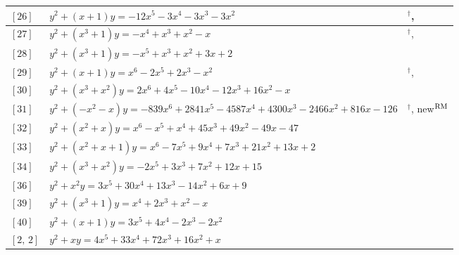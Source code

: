 \documentclass[11pt]{amsart}
\begin{document}
\begin{longtable}{|>{\raggedright\arraybackslash}p{1.7cm}|>{\raggedright\arraybackslash}p{}|>{\raggedright\arraybackslash}p{2.1cm}|}
$[26]$ & \href{https://alpha.lmfdb.org/Genus2Curve/Q/?jump=[[0,0,-3,-3,-3,-12],[1,1]]}{$y^2 + (x+1)y = -12x^{5}-3x^{4}-3x^{3}-3x^{2}$} & \cite{Leprevost1993}$^\dagger$, \cite{Leprevost1995}\\ \hline
$[27]$ & \href{https://www.lmfdb.org/Genus2Curve/Q/604/a/9664/2}{$y^2 + (x^{3}+1)y = -x^{4}+x^{3}+x^{2}-x$} & \cite{Howe2015}$^\dagger$, \cite{Nicholls2018}\\ \hline
$[28]$ & \href{https://www.lmfdb.org/Genus2Curve/Q/249/a/6723/1}{$y^2 + (x^{3}+1)y = -x^{5}+x^{3}+x^{2}+3x+2$} & \cite{PP2012,PZP2013}\\ \hline
$[29]$ & \href{https://www.lmfdb.org/Genus2Curve/Q/976/a/999424/1}{$y^2 + (x+1)y = x^{6}-2x^{5}+2x^{3}-x^{2}$} & \cite{Leprevost1993}$^\dagger$, \cite{Leprevost1995}\\ \hline
$[30]$ & \href{https://alpha.lmfdb.org/Genus2Curve/Q/?jump=[[0,-1,16,-12,-10,4,2],[0,0,1,1]]}{$y^2 + (x^{3}+x^{2})y = 2x^{6}+4x^{5}-10x^{4}-12x^{3}+16x^{2}-x$} & \cite{PP2015}\\ \hline
$[31]$ & $y^2 + (-x^{2}-x)y = -839x^{6}+2841x^{5}-4587x^{4}+4300x^{3}-2466x^{2}+816x-126$ & \cite{CEHJMPV}$^\dagger$, new$^{\rm RM}$\\ \hline
$[32]$ & \href{https://alpha.lmfdb.org/Genus2Curve/Q/?jump=[[-47,-49,49,45,1,-1,1],[0,1,1]]}{$y^2 + (x^{2}+x)y = x^{6}-x^{5}+x^{4}+45x^{3}+49x^{2}-49x-47$} & \cite{Elkies2002}\\ \hline
$[33]$ & \href{https://alpha.lmfdb.org/Genus2Curve/Q/?jump=[[2,13,21,7,9,-7,1],[1,1,1]]}{$y^2 + (x^{2}+x+1)y = x^{6}-7x^{5}+9x^{4}+7x^{3}+21x^{2}+13x+2$} & \cite{PZP2013}\\ \hline
$[34]$ & \href{https://alpha.lmfdb.org/Genus2Curve/Q/?jump=[[15,12,7,3,0,-2],[0,0,1,1]]}{$y^2 + (x^{3}+x^{2})y = -2x^{5}+3x^{3}+7x^{2}+12x+15$} & \cite{Elkies2002}\\ \hline
$[36]$ & \href{https://alpha.lmfdb.org/Genus2Curve/Q/?jump=[[9,6,-14,13,30,3],[0,0,1]]}{$y^2 + x^{2}y = 3x^{5}+30x^{4}+13x^{3}-14x^{2}+6x+9$} & \cite{PP2015}\\ \hline
$[39]$ & \href{https://www.lmfdb.org/Genus2Curve/Q/1116/a/214272/1}{$y^2 + (x^{3}+1)y = x^{4}+2x^{3}+x^{2}-x$} & \cite{Elkies2002}\\ \hline
$[40]$ & \href{https://alpha.lmfdb.org/Genus2Curve/Q/?jump=[[0,0,-2,-2,4,3],[1,1]]}{$y^2 + (x+1)y = 3x^{5}+4x^{4}-2x^{3}-2x^{2}$} & \cite{Elkies2002}\\ \hline
$[2,\,2]$ & \href{https://www.lmfdb.org/Genus2Curve/Q/464/a/29696/2}{$y^2 + xy = 4x^{5}+33x^{4}+72x^{3}+16x^{2}+x$} & \cite{BSSVY}\\ \hline

\end{longtable}
\end{document}
